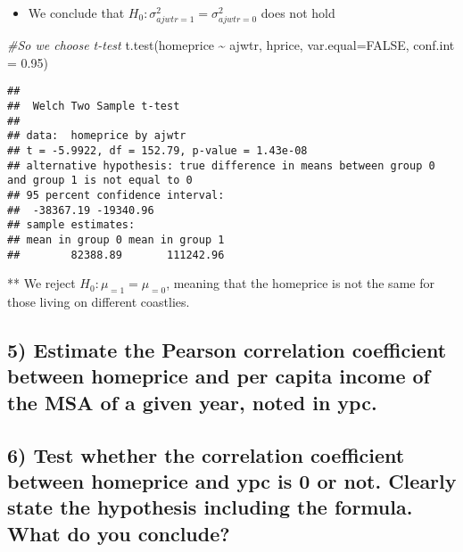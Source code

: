 \documentclass[
  12pt,
]{article}
\newenvironment{Shaded}{\begin{snugshade}}{\end{snugshade}}
\newcommand{\AttributeTok}[1]{\textcolor[rgb]{0.77,0.63,0.00}{#1}}
\newcommand{\CommentTok}[1]{\textcolor[rgb]{0.56,0.35,0.01}{\textit{#1}}}
\newcommand{\ConstantTok}[1]{\textcolor[rgb]{0.00,0.00,0.00}{#1}}
\newcommand{\FloatTok}[1]{\textcolor[rgb]{0.00,0.00,0.81}{#1}}
\newcommand{\FunctionTok}[1]{\textcolor[rgb]{0.00,0.00,0.00}{#1}}
\newcommand{\NormalTok}[1]{#1}
\newcommand{\SpecialCharTok}[1]{\textcolor[rgb]{0.00,0.00,0.00}{#1}}
\providecommand{\tightlist}{%
  \setlength{\itemsep}{0pt}\setlength{\parskip}{0pt}}
\begin{document}
\begin{itemize}
\tightlist
\item
  We conclude that \(H_0:\sigma^2_{ajwtr=1}=\sigma^2_{ajwtr=0}\) does
  not hold\\
\end{itemize}

\begin{Shaded}
\begin{Highlighting}[]
\CommentTok{\#So we choose t{-}test}
\FunctionTok{t.test}\NormalTok{(homeprice }\SpecialCharTok{\textasciitilde{}}\NormalTok{ ajwtr, hprice, }\AttributeTok{var.equal=}\ConstantTok{FALSE}\NormalTok{, }\AttributeTok{conf.int =} \FloatTok{0.95}\NormalTok{)}
\end{Highlighting}
\end{Shaded}

\begin{verbatim}
## 
##  Welch Two Sample t-test
## 
## data:  homeprice by ajwtr
## t = -5.9922, df = 152.79, p-value = 1.43e-08
## alternative hypothesis: true difference in means between group 0 and group 1 is not equal to 0
## 95 percent confidence interval:
##  -38367.19 -19340.96
## sample estimates:
## mean in group 0 mean in group 1 
##        82388.89       111242.96
\end{verbatim}

** We reject \(H_0: \mu_{=1}=\mu_{=0}\), meaning that the homeprice is
not the same for those living on different coastlies.

\hypertarget{estimate-the-pearson-correlation-coefficient-between-homeprice-and-per-capita-income-of-the-msa-of-a-given-year-noted-in-ypc.}{%
\subsection{5) Estimate the Pearson correlation coefficient between
homeprice and per capita income of the MSA of a given year, noted in
ypc.}\label{estimate-the-pearson-correlation-coefficient-between-homeprice-and-per-capita-income-of-the-msa-of-a-given-year-noted-in-ypc.}}

\hypertarget{test-whether-the-correlation-coefficient-between-homeprice-and-ypc-is-0-or-not.-clearly-state-the-hypothesis-including-the-formula.-what-do-you-conclude}{%
\subsection{6) Test whether the correlation coefficient between
homeprice and ypc is 0 or not. Clearly state the hypothesis including
the formula. What do you
conclude?}\label{test-whether-the-correlation-coefficient-between-homeprice-and-ypc-is-0-or-not.-clearly-state-the-hypothesis-including-the-formula.-what-do-you-conclude}}
\end{document}
